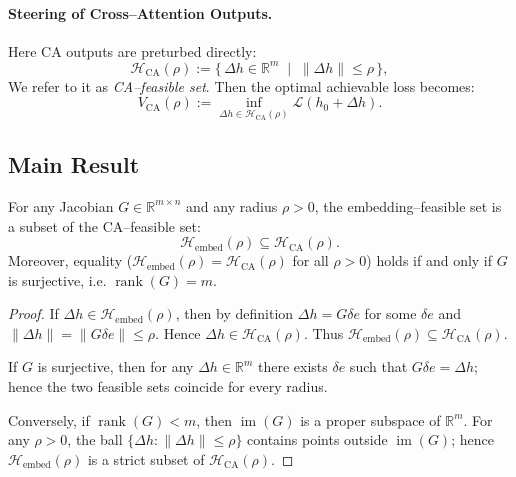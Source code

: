 \paragraph{Steering of Cross–Attention Outputs.}
Here CA outputs are preturbed directly:
\begin{equation}
    \mathcal{H}_{\mathrm{CA}}(\rho)
    :=
    \{\, \Delta h \in \mathbb{R}^m \;\mid\; \|\Delta h\| \le \rho \,\},
\end{equation}
We refer to it as \textit{CA–feasible set}. Then the optimal achievable loss becomes:
\begin{equation}
    V_{\mathrm{CA}}(\rho)
    :=
    \inf_{\Delta h \in \mathcal{H}_{\mathrm{CA}}(\rho)}
        \mathcal{L}(h_0 + \Delta h).
\end{equation}

\subsection{Main Result}

\begin{theorem}
\label{thm:ca-dominates}
For any Jacobian $G \in \mathbb{R}^{m \times n}$ and any radius $\rho > 0$,
the embedding–feasible set is a subset of the CA–feasible set:
\begin{equation}
    \mathcal{H}_{\mathrm{embed}}(\rho)
    \subseteq 
    \mathcal{H}_{\mathrm{CA}}(\rho).
\end{equation}
Moreover, equality ($\mathcal{H}_{\mathrm{embed}}(\rho) = \mathcal{H}_{\mathrm{CA}}(\rho)$
for all $\rho > 0$) holds if and only if $G$ is surjective, i.e.
$\operatorname{rank}(G) = m$.
\end{theorem}

\begin{proof}
If $\Delta h \in \mathcal{H}_{\mathrm{embed}}(\rho)$, then by definition
$\Delta h = G \delta e$ for some $\delta e$ and 
$\|\Delta h\| = \|G \delta e\| \le \rho$. 
Hence $\Delta h \in \mathcal{H}_{\mathrm{CA}}(\rho)$.
Thus 
$\mathcal{H}_{\mathrm{embed}}(\rho) \subseteq \mathcal{H}_{\mathrm{CA}}(\rho)$.

If $G$ is surjective, then for any $\Delta h \in \mathbb{R}^m$ there exists
$\delta e$ such that $G \delta e = \Delta h$; hence the two feasible
sets coincide for every radius.

Conversely, if $\operatorname{rank}(G) < m$, then 
$\operatorname{im}(G)$ is a proper subspace of $\mathbb{R}^m$. 
For any $\rho > 0$, the ball 
$\{\Delta h : \|\Delta h\| \le \rho\}$ contains points outside 
$\operatorname{im}(G)$; 
hence $\mathcal{H}_{\mathrm{embed}}(\rho)$ is a strict subset of 
$\mathcal{H}_{\mathrm{CA}}(\rho)$.
\end{proof}

